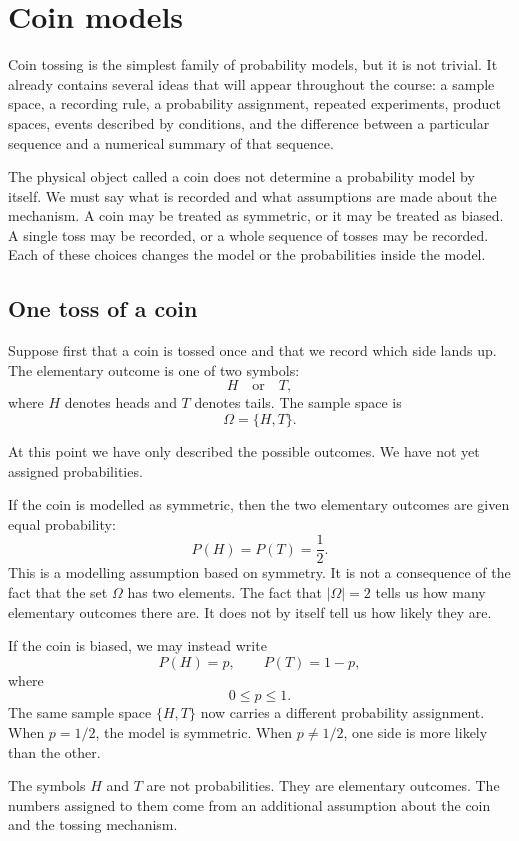 \section{Coin models}

Coin tossing is the simplest family of probability models, but it is not
trivial. It already contains several ideas that will appear throughout the
course: a sample space, a recording rule, a probability assignment, repeated
experiments, product spaces, events described by conditions, and the difference
between a particular sequence and a numerical summary of that sequence.

The physical object called a coin does not determine a probability model by
itself. We must say what is recorded and what assumptions are made about the
mechanism. A coin may be treated as symmetric, or it may be treated as biased.
A single toss may be recorded, or a whole sequence of tosses may be recorded.
Each of these choices changes the model or the probabilities inside the model.

\subsection*{One toss of a coin}

Suppose first that a coin is tossed once and that we record which side lands up.
The elementary outcome is one of two symbols:
\[
H \quad\text{or}\quad T,
\]
where \(H\) denotes heads and \(T\) denotes tails. The sample space is
\[
\Omega=\{H,T\}.
\]

At this point we have only described the possible outcomes. We have not yet
assigned probabilities.

If the coin is modelled as symmetric, then the two elementary outcomes are
given equal probability:
\[
P(H)=P(T)=\frac12.
\]
This is a modelling assumption based on symmetry. It is not a consequence of the
fact that the set \(\Omega\) has two elements. The fact that \(|\Omega|=2\) tells
us how many elementary outcomes there are. It does not by itself tell us how
likely they are.

If the coin is biased, we may instead write
\[
P(H)=p,\qquad P(T)=1-p,
\]
where
\[
0\leq p\leq 1.
\]
The same sample space \(\{H,T\}\) now carries a different probability
assignment. When \(p=1/2\), the model is symmetric. When \(p\neq 1/2\), one side
is more likely than the other.

\begin{remarkbox}
The symbols \(H\) and \(T\) are not probabilities. They are elementary outcomes.
The numbers assigned to them come from an additional assumption about the coin
and the tossing mechanism.
\end{remarkbox}


